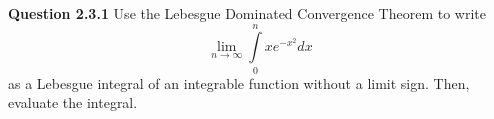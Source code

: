 \documentclass{article}
\theoremstyle{plain}
\begin{document}
\noindent \textbf{Question 2.3.1} Use the Lebesgue Dominated Convergence Theorem to write $$ \lim\limits_{n \to \infty} \int\limits_{0}^{n} xe^{-x^{2}} dx $$ as a Lebesgue integral of an integrable function without a limit sign. Then, evaluate the integral.
\end{document}
